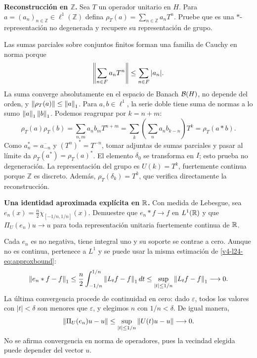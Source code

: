 \begin{ejercicio}\label{ej:v4-l24-2}
\textbf{Reconstrucción en $\mathbb Z$.}
Sea $T$ un operador unitario en $H$. Para $a=(a_n)_{n\in\mathbb Z}\in\ell^1(\mathbb Z)$ defina $\rho_T(a)=\sum_{n\in\mathbb Z}a_nT^n$. Pruebe que es una $*$-representación no degenerada y recupere su representación de grupo.

\end{ejercicio}
\begin{solucion} Las sumas parciales sobre conjuntos finitos forman una familia de Cauchy en norma porque
\[
\left\lVert\sum_{n\in F}a_nT^n\right\rVert\leq\sum_{n\in F}|a_n|.
\]
La suma converge absolutamente en el espacio de Banach $\mathcal B(H)$, no depende del orden, y $\left\lVert\rho_T(a)\right\rVert\leq\left\lVert a\right\rVert_1$. Para $a,b\in\ell^1$, la serie doble tiene suma de normas a lo sumo $\left\lVert a\right\rVert_1\left\lVert b\right\rVert_1$. Podemos reagrupar por $k=n+m$:
\[
\rho_T(a)\rho_T(b)=\sum_{n,m}a_nb_mT^{n+m}
=\sum_k\left(\sum_n a_nb_{k-n}\right)T^k=\rho_T(a*b).
\]
Como $a^*_n=\overline{a_{-n}}$ y $(T^n)^*=T^{-n}$, tomar adjuntas de sumas parciales y pasar al límite da $\rho_T(a^*)=\rho_T(a)^*$. El elemento $\delta_0$ se transforma en $I$; esto prueba no degeneración. La representación del grupo es $U(k)=T^k$, fuertemente continua porque $\mathbb Z$ es discreto. Además, $\rho_T(\delta_k)=T^k$, que verifica directamente la reconstrucción.\end{solucion}

\begin{ejercicio}\label{ej:v4-l24-3}
\textbf{Una identidad aproximada explícita en $\mathbb R$.}
Con medida de Lebesgue, sea $e_n(x)=\tfrac n2\chi_{[-1/n,1/n]}(x)$. Demuestre que $e_n*f\to f$ en $L^1(\mathbb R)$ y que $\Pi_U(e_n)u\to u$ para toda representación unitaria fuertemente continua de $\mathbb R$.

\end{ejercicio}
\begin{solucion} Cada $e_n$ es no negativa, tiene integral uno y su soporte se contrae a cero. Aunque no es continua, pertenece a $L^1$ y se puede usar la misma estimación de \eqref{v4-l24-eq:approxbound}:
\[
\left\lVert e_n*f-f\right\rVert_1\leq\frac n2\int_{-1/n}^{1/n}\left\lVert L_tf-f\right\rVert_1dt
\leq\sup_{|t|\leq1/n}\left\lVert L_tf-f\right\rVert_1\longrightarrow0.
\]
La última convergencia procede de continuidad en cero: dado $\varepsilon$, todos los valores con $|t|<\delta$ son menores que $\varepsilon$, y elegimos $n$ con $1/n<\delta$. De igual manera,
\[
\left\lVert\Pi_U(e_n)u-u\right\rVert\leq\sup_{|t|\leq1/n}\left\lVert U(t)u-u\right\rVert\longrightarrow0.
\]
No se afirma convergencia en norma de operadores, pues la vecindad elegida puede depender del vector $u$.\end{solucion}

